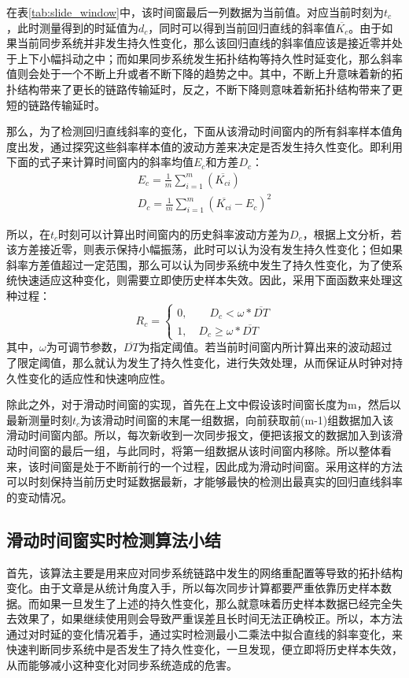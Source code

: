 在表\ref{tab:slide_window}中，该时间窗最后一列数据为当前值。对应当前时刻为$t_{c}$，此时测量得到的时延值为$d_{c}$，同时可以得到当前回归直线的斜率值$\overline{K_{c}}$。由于如果当前同步系统并非发生持久性变化，那么该回归直线的斜率值应该是接近零并处于上下小幅抖动之中；而如果同步系统发生拓扑结构等持久性时延变化，那么斜率值则会处于一个不断上升或者不断下降的趋势之中。其中，不断上升意味着新的拓扑结构带来了更长的链路传输延时，反之，不断下降则意味着新拓扑结构带来了更短的链路传输延时。

那么，为了检测回归直线斜率的变化，下面从该滑动时间窗内的所有斜率样本值角度出发，通过探究这些斜率样本值的波动方差来决定是否发生持久性变化。即利用下面的式子来计算时间窗内的斜率均值$E_{c}$和方差$D_{c}$：
\begin{align}
E_{c} = \frac{1}{m}\sum_{i=1}^{m}(\overline{K_{ci}}) \\
D_{c} = \frac{1}{m}\sum_{i=1}^{m}(\overline{K_{ci}} - E_{c}) ^ {2}
\end{align}

所以，在$t_{c}$时刻可以计算出时间窗内的历史斜率波动方差为$D_{c}$，根据上文分析，若该方差接近零，则表示保持小幅振荡，此时可以认为没有发生持久性变化；但如果斜率方差值超过一定范围，那么可以认为同步系统中发生了持久性变化，为了使系统快速适应这种变化，则需要立即使历史样本失效。因此，采用下面函数来处理这种过程：
\begin{equation}
R_{c} = \left\{
	\begin{array}{ll} %
		0, \qquad D_{c} < \omega * \overline{DT} \\
		1, \quad D_{c} \geq \omega * \overline{DT} 
	\end{array}
	\right. 
\end{equation}
其中，$\omega$为可调节参数，$\overline{DT}$为指定阈值。若当前时间窗内所计算出来的波动超过了限定阈值，那么就认为发生了持久性变化，进行失效处理，从而保证从时钟对持久性变化的适应性和快速响应性。

除此之外，对于滑动时间窗的实现，首先在上文中假设该时间窗长度为m，然后以最新测量时刻$t_{c}$为该滑动时间窗的末尾一组数据，向前获取前(m-1)组数据加入该滑动时间窗内部。所以，每次新收到一次同步报文，便把该报文的数据加入到该滑动时间窗的最后一组，与此同时，将第一组数据从该时间窗内移除。所以整体看来，该时间窗是处于不断前行的一个过程，因此成为滑动时间窗。采用这样的方法可以时刻保持当前历史时延数据最新，才能够最快的检测出最真实的回归直线斜率的变动情况。

\subsection{滑动时间窗实时检测算法小结}
首先，该算法主要是用来应对同步系统链路中发生的网络重配置等导致的拓扑结构变化。由于文章是从统计角度入手，所以每次同步计算都要严重依靠历史样本数据。而如果一旦发生了上述的持久性变化，那么就意味着历史样本数据已经完全失去效果了，如果继续使用则会导致严重误差且长时间无法正确校正。所以，本方法通过对时延的变化情况着手，通过实时检测最小二乘法中拟合直线的斜率变化，来快速判断同步系统中是否发生了持久性变化，一旦发现，便立即将历史样本失效，从而能够减小这种变化对同步系统造成的危害。

